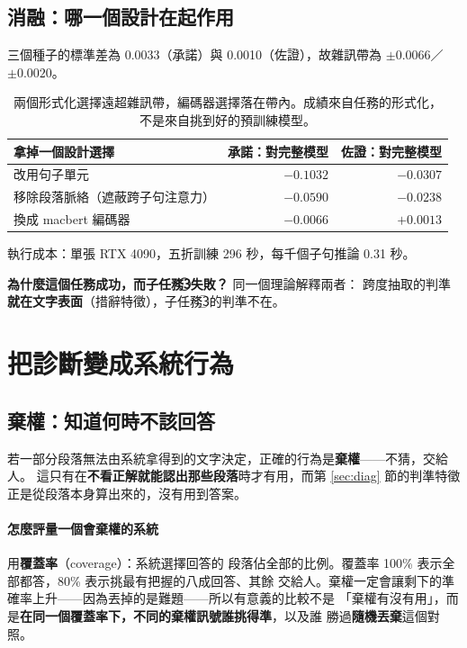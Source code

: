 \documentclass[11pt,a4paper]{ctexart}
\begin{document}
\subsection{消融：哪一個設計在起作用}

三個種子的標準差為 0.0033（承諾）與 0.0010（佐證），故雜訊帶為 $\pm 0.0066$／$\pm 0.0020$。

\begin{table}[h]
\centering\small
\begin{tabular}{@{}lrr@{}}
\toprule
拿掉一個設計選擇 & 承諾：對完整模型 & 佐證：對完整模型 \\
\midrule
\rowcolor{yellow!15}
改用句子單元 & $\mathbf{-0.1032}$ & $\mathbf{-0.0307}$ \\
\rowcolor{yellow!15}
移除段落脈絡（遮蔽跨子句注意力） & $\mathbf{-0.0590}$ & $\mathbf{-0.0238}$ \\
換成 macbert 編碼器 & $-0.0066$ & $+0.0013$ \\
\bottomrule
\end{tabular}
\caption{兩個形式化選擇遠超雜訊帶，編碼器選擇落在帶內。成績來自任務的形式化，
不是來自挑到好的預訓練模型。}
\end{table}

執行成本：單張 RTX 4090，五折訓練 296 秒，每千個子句推論 0.31 秒。

\begin{tcolorbox}[colback=blue!5, colframe=blue!50]
\textbf{為什麼這個任務成功，而子任務\textcircled{3}失敗？} 同一個理論解釋兩者：
跨度抽取的判準\textbf{就在文字表面}（措辭特徵），子任務\textcircled{3}的判準不在。
\end{tcolorbox}

\section{把診斷變成系統行為}
\label{sec:act}

\subsection{棄權：知道何時不該回答}

若一部分段落無法由系統拿得到的文字決定，正確的行為是\textbf{棄權}——不猜，交給人。
這只有在\textbf{不看正解就能認出那些段落}時才有用，而第 \ref{sec:diag} 節的判準特徵
正是從段落本身算出來的，沒有用到答案。

\paragraph{怎麼評量一個會棄權的系統} 用\textbf{覆蓋率}（coverage）：系統選擇回答的
段落佔全部的比例。覆蓋率 100\% 表示全部都答，80\% 表示挑最有把握的八成回答、其餘
交給人。棄權一定會讓剩下的準確率上升——因為丟掉的是難題——所以有意義的比較不是
「棄權有沒有用」，而是\textbf{在同一個覆蓋率下，不同的棄權訊號誰挑得準}，以及誰
勝過\textbf{隨機丟棄}這個對照。
\end{document}
